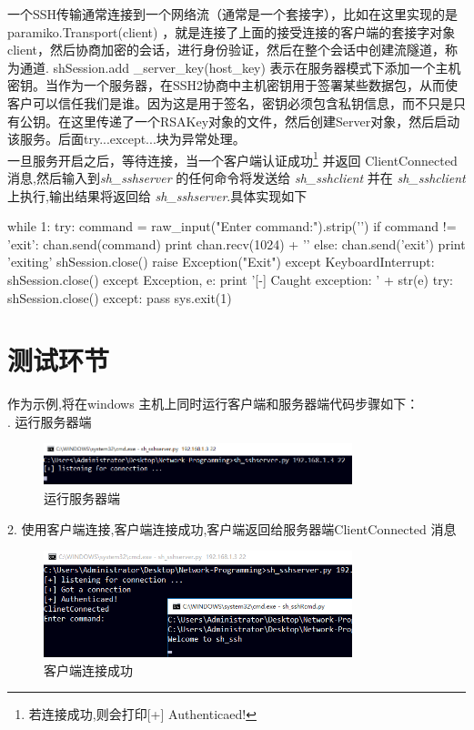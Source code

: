 \documentclass[UTF8,nofonts,a4paper]{ctexart}
\begin{document}
\indent 一个SSH传输通常连接到一个网络流（通常是一个套接字），比如在这里实现的是 paramiko.Transport(client) ，就是连接了上面的接受连接的客户端的套接字对象client，然后协商加密的会话，进行身份验证，然后在整个会话中创建流隧道，称为通道. shSession.add \_server\_key(host\_key) 表示在服务器模式下添加一个主机密钥。当作为一个服务器，在SSH2协商中主机密钥用于签署某些数据包，从而使客户可以信任我们是谁。因为这是用于签名，密钥必须包含私钥信息，而不只是只有公钥。在这里传递了一个RSAKey对象的文件，然后创建Server对象，然后启动该服务。后面try...except...块为异常处理。\\
\indent 一旦服务开启之后，等待连接，当一个客户端认证成功\footnote{若连接成功,则会打印[+] Authenticaed!}  并返回 ClientConnected 消息,然后输入到\textit{sh\_sshserver} 的任何命令将发送给\textit{ sh\_sshclient} 并在 \textit{sh\_sshclient} 上执行,输出结果将返回给\textit{ sh\_sshserver}.具体实现如下
\begin{python}
while 1:
	try:
		command = raw_input("Enter command:").strip('\n')
		if command != 'exit':
			chan.send(command)
			print chan.recv(1024) + '\n'
		else:
			chan.send('exit')
			print 'exiting'
			shSession.close()
			raise Exception("Exit")
		except KeyboardInterrupt:
			shSession.close()
	except Exception, e:
		print '[-] Caught exception: ' + str(e)
		try:
			shSession.close()
		except:
			pass
		sys.exit(1)
\end{python}

\newpage

\section{测试环节}
作为示例,将在windows 主机上同时运行客户端和服务器端代码步骤如下：\\
. 运行服务器端
\begin{figure}[htbp]
\begin{center}
  \includegraphics[width=0.8\textwidth]{1.png}
  \caption{运行服务器端}
\end{center}
\end{figure}

2. 使用客户端连接,客户端连接成功,客户端返回给服务器端ClientConnected 消息\\
\begin{figure}[htbp]
\begin{center}
  \includegraphics[width=0.8\textwidth]{2.png}
  \caption{客户端连接成功}
\end{center}
\end{figure}
\end{document}
